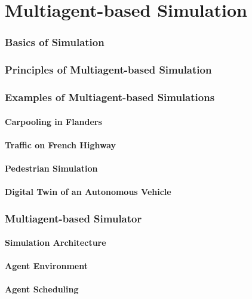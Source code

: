 \part{Multiagent-based Simulation}
\begin{bibliographysection}

	\section[Simulation Basics]{Basics of Simulation}
	

	\section[MABS Principles]{Principles of Multiagent-based Simulation}
	

	\section[MABS Examples]{Examples of Multiagent-based Simulations}
	\subsection{Carpooling in Flanders}
	
	\subsection{Traffic on French Highway}
	
	\subsection{Pedestrian Simulation}
	
	\subsection{Digital Twin of an Autonomous Vehicle}
	

	\section[MABS Simulator]{Multiagent-based Simulator}
	\subsection{Simulation Architecture}
	
	\subsection{Agent Environment}
	
	\subsection{Agent Scheduling}
	

	\thanksslide
\end{bibliographysection}

